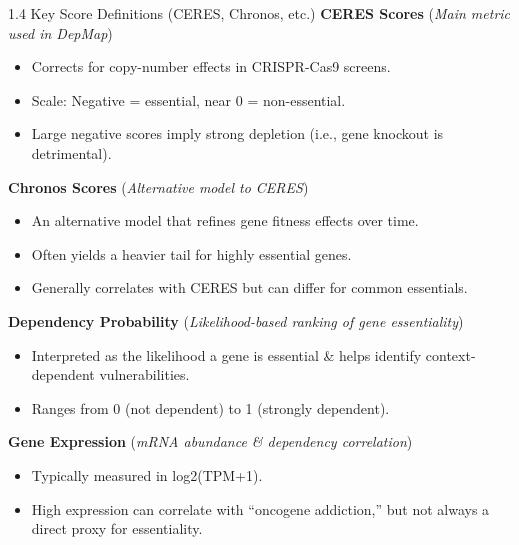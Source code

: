 \documentclass[10pt]{beamer}
\begin{document}
\begin{frame}{1.4 Key Score Definitions (CERES, Chronos, etc.)}
  \textbf{CERES Scores} (\textit{Main metric used in DepMap})
  \begin{itemize}
    \item Corrects for copy-number effects in CRISPR-Cas9 screens.
    \item Scale: Negative = essential, near 0 = non-essential.
    \item Large negative scores imply strong depletion (i.e., gene knockout is detrimental).
  \end{itemize}
  \vspace{0.3em}

  \textbf{Chronos Scores} (\textit{Alternative model to CERES})
  \begin{itemize}
    \item An alternative model that refines gene fitness effects over time.
    \item Often yields a heavier tail for highly essential genes.
    \item Generally correlates with CERES but can differ for common essentials.
  \end{itemize}
  \vspace{0.3em}

  \textbf{Dependency Probability} (\textit{Likelihood-based ranking of gene essentiality})
  \begin{itemize}
    \item Interpreted as the likelihood a gene is essential \& helps identify context-dependent vulnerabilities.
    \item Ranges from 0 (not dependent) to 1 (strongly dependent).
  \end{itemize}
  \vspace{0.3em}

  \textbf{Gene Expression} (\textit{mRNA abundance \& dependency correlation})
  \begin{itemize}
    \item Typically measured in log2(TPM+1).
    \item High expression can correlate with “oncogene addiction,” 
          but not always a direct proxy for essentiality.
  \end{itemize}
\end{frame}
\end{document}
